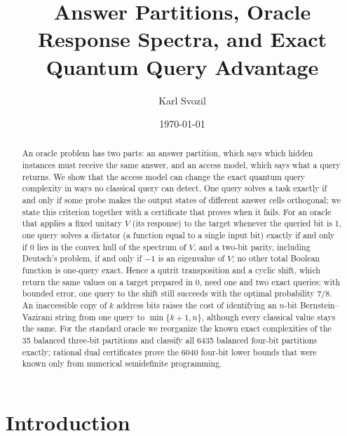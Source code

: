 \documentclass[
  aps,
  pra,
  reprint,
  nofootinbib
]{revtex4-2}
\begin{document}
\title{Answer Partitions, Oracle Response Spectra, and Exact Quantum Query Advantage}

\author{Karl Svozil }

\date{\today}

\begin{abstract}
An oracle problem has two parts: an answer partition, which says which hidden
instances must receive the same answer, and an access model, which says what a
query returns. We show that the access model can change the exact quantum query
complexity in ways no classical query can detect. One query solves a task
exactly if and only if some probe makes the output states of different answer
cells orthogonal; we state this criterion together with a certificate that
proves when it fails. For an oracle that applies a fixed unitary \(V\) (its
response) to the target whenever the queried bit is 1, one query solves a
dictator (a function equal to a single input bit) exactly if and only if \(0\)
lies in the convex hull of the spectrum of \(V\), and a two-bit parity,
including Deutsch's problem, if and only if \(-1\) is an eigenvalue of \(V\);
no other total Boolean function is one-query exact. Hence a qutrit
transposition and a cyclic shift, which return the same values on a target
prepared in 0, need one and two exact queries; with bounded error, one query to the
shift still succeeds with the optimal probability \(7/8\). An inaccessible copy
of \(k\) address bits raises the cost of identifying an \(n\)-bit
Bernstein--Vazirani string from one query to \(\min\{k+1,n\}\), although every
classical value stays the same. For the
standard oracle we reorganize the known exact complexities of the 35 balanced
three-bit partitions and classify all 6435 balanced four-bit partitions
exactly; rational dual certificates prove the 6040 four-bit lower bounds that
were known only from numerical semidefinite programming.
\end{abstract}

\maketitle

\section{Introduction}
\end{document}
